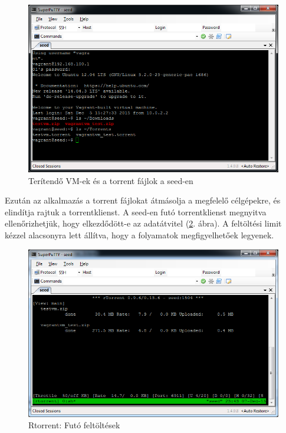 \begin{figure}[ht]
\centering
\includegraphics[width=140mm, keepaspectratio]{figures/test_seed_files.png}
\caption{Terítendő VM-ek és a torrent fájlok a seed-en}
\label{fig:seed_files}
\end{figure}

Ezután az alkalmazás a torrent fájlokat átmásolja a megfelelő célgépekre, és elindítja rajtuk a torrentklienst. A seed-en futó torrentklienst megnyitva ellenőrizhetjük, hogy elkezdődött-e az adatátvitel (\ref{fig:seed_torrent}. ábra). A feltöltési limit kézzel alacsonyra lett állítva, hogy a folyamatok megfigyelhetőek legyenek.

\begin{figure}[ht]
\centering
\includegraphics[width=140mm, keepaspectratio]{figures/test_seed_torrent.png}
\caption{Rtorrent: Futó feltöltések}
\label{fig:seed_torrent}
\end{figure}


